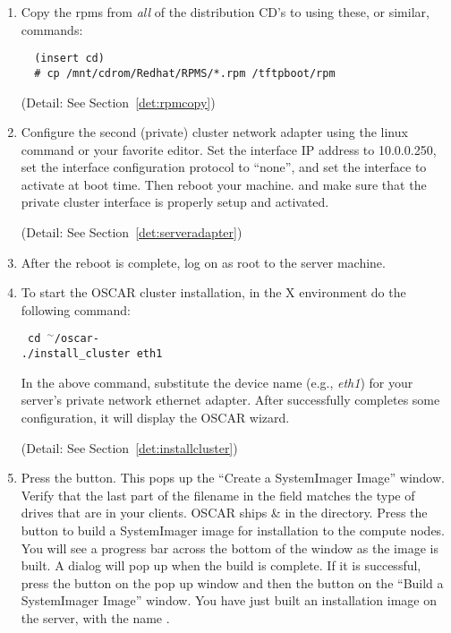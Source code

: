 \begin {enumerate}
  (Detail: See Section~\ref{det:unpack})

\item Copy the rpms from \emph{all} of the distribution CD's to
   using these, or similar, commands:

\begin{verbatim}
  (insert cd)
  # cp /mnt/cdrom/Redhat/RPMS/*.rpm /tftpboot/rpm
\end{verbatim}
(Detail: See Section~\ref{det:rpmcopy})

\item Configure the second (private) cluster network adapter using the
  linux  command or your favorite editor. Set
  the interface IP address to 10.0.0.250, set the interface
  configuration protocol to ``none'', and set the interface to
  activate at boot time.  Then reboot your machine. and make sure that
  the private cluster interface is properly setup and activated.

(Detail: See Section~\ref{det:serveradapter})

\item After the reboot is complete, log on as root to the server
  machine.
  
\item To start the OSCAR cluster installation, in the X environment do
  the following command:

\vspace{11pt}
{\tt
  cd $^\sim$/oscar-\oscarversion \\
  ./install\_cluster eth1
}
\vspace{11pt}
  
In the above command, substitute the device name (e.g., \emph{eth1})
for your server's private network ethernet adapter. After
 successfully completes some configuration, it
will display the OSCAR wizard.  

(Detail: See Section~\ref{det:installcluster})

\item Press the  button.  This pops
  up the ``Create a SystemImager Image'' window. Verify that the last
  part of the filename in the  field
  matches the type of drives that are in your clients. OSCAR ships
   \&  in the
   directory.  Press the  button
  to build a SystemImager image for installation to the compute nodes.
  You will see a progress bar across the bottom of the window as the
  image is built.  A dialog will pop up when the build is complete.
  If it is successful, press the  button on the pop up
  window and then the  button on the ``Build a
  SystemImager Image'' window. You have just built an installation
  image on the server, with the name .


\end{enumerate}
